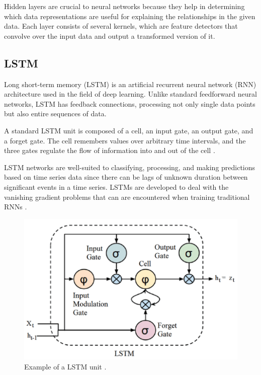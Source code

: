 \documentclass{turabian-thesis}
\begin{document}
Hidden layers are crucial to neural networks because they help in determining which data representations are useful for explaining the relationships in the given data. Each layer consists of several kernels,  which are feature detectors that convolve over the input data and output a transformed version of it. 



\subsection{LSTM}

Long short-term memory (LSTM) is an artificial recurrent neural network (RNN) architecture used in the field of deep learning. Unlike standard feedforward neural networks, LSTM has feedback connections, processing not only single data points but also entire sequences of data. 

A standard LSTM unit is composed of a cell, an input gate, an output gate, and a forget gate. The cell remembers values over arbitrary time intervals, and the three gates regulate the flow of information into and out of the cell \cite{donahue_long-term_2016}.

LSTM networks are well-suited to classifying, processing, and making predictions based on time series data since there can be lags of unknown duration between significant events in a time series. LSTMs are developed to deal with the vanishing gradient problems that can are encountered when training traditional RNNs \cite{donahue_long-term_2016}. 

\begin{figure}[h!]
   \begin{center}
      \includegraphics[scale=0.5]{../media/lstm_highlight.png}
   \end{center}
   \caption{Example of a LSTM unit \cite{donahue_long-term_2016}.}
   \label{fig:reinforcementAgent}
\end{figure}
\end{document}
